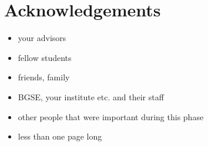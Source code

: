 \chapter{Acknowledgements}

\begin{itemize}
    \item your advisors 
    \item fellow students
    \item friends, family
    \item BGSE, your institute etc. and their staff
    \item other people that were important during this phase
    
    \item less than one page long 
\end{itemize}
